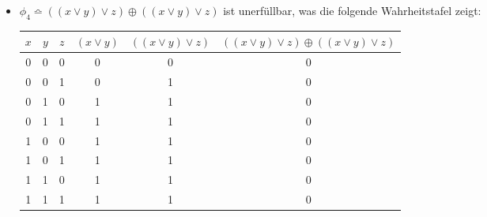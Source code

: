 \documentclass[a4paper,10pt]{article}
\begin{document}
\begin{enumerate}
\begin{itemize}
\item $\phi_4 \bumpeq ((x \vee y) \vee z) \oplus ((x \vee y) \vee z)$ ist unerfüllbar, was die folgende Wahrheitstafel zeigt: \\
\begin{tabular}{|c|c|c|c|c|c|}
\hline 
\rule[-1ex]{0pt}{2.5ex} $x$ & $y$ & $z$ & $(x \vee y)$ & $((x \vee y) \vee z)$ & $((x \vee y) \vee z) \oplus ((x \vee y) \vee z)$ \\ 
\hline 
\rule[-1ex]{0pt}{2.5ex} 0 & 0 & 0 & 0 & 0 & 0 \\ 
\hline 
\rule[-1ex]{0pt}{2.5ex} 0 & 0 & 1 & 0 & 1 & 0 \\ 
\hline 
\rule[-1ex]{0pt}{2.5ex} 0 & 1 & 0 & 1 & 1 & 0 \\ 
\hline 
\rule[-1ex]{0pt}{2.5ex} 0 & 1 & 1 & 1 & 1 & 0 \\ 
\hline 
\rule[-1ex]{0pt}{2.5ex} 1 & 0 & 0 & 1 & 1 & 0 \\ 
\hline 
\rule[-1ex]{0pt}{2.5ex} 1 & 0 & 1 & 1 & 1 & 0 \\ 
\hline 
\rule[-1ex]{0pt}{2.5ex} 1 & 1 & 0 & 1 & 1 & 0 \\ 
\hline 
\rule[-1ex]{0pt}{2.5ex} 1 & 1 & 1 & 1 & 1 & 0 \\ 
\hline 
\end{tabular} 
\end{itemize}


\end{enumerate}
\end{document}
